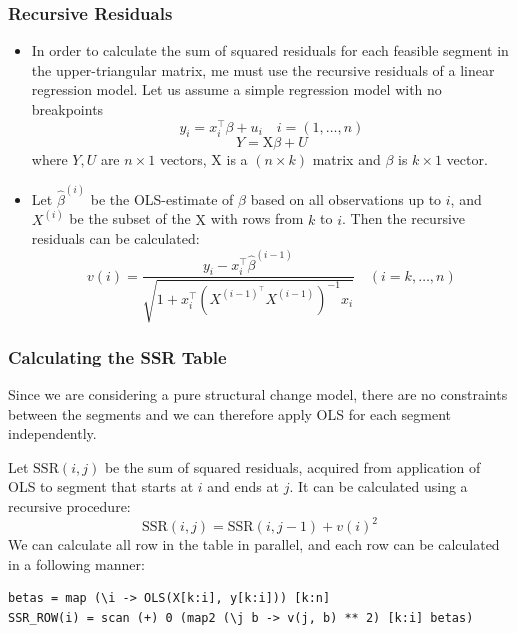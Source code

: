 \documentclass[presentation.tex]{subfiles}
\begin{document}
\begin{frame}
  \frametitle{Recursive Residuals}
  \begin{itemize}
  \item 
In order to calculate the sum of squared residuals for each feasible segment in
the upper-triangular matrix, me must use the recursive residuals of a linear
regression model. Let us assume a simple regression model with no breakpoints
\[
y_i = x_i^{\top} \beta + u_i \quad i = (1, \hdots, n)
\]
\[
Y = \mathrm{X}\beta + U
\]
where $Y, U$ are $n \times 1$ vectors, $\mathrm{X}$ is a $(n \times k)$ matrix
and $\beta$ is $k \times 1$ vector.

\item 
Let $\hat{\beta}^{(i)}$ be the OLS-estimate of $\beta$
based on all observations up to $i$, and $X^{(i)}$ be the subset of the
$\mathrm{X}$ with rows from $k$ to $i$.
Then the recursive residuals can be calculated:
\[
v(i)=\frac{y_{i}-x_{i}^{\top}
  \hat{\beta}^{(i-1)}}{\sqrt{1+x_{i}^{\top}\left(X^{(i-1)^{\top}}
    X^{(i-1)}\right)^{-1} x_{i}}} \quad(i=k, \ldots, n)
\]

  \end{itemize}
\end{frame}

\begin{frame}[fragile]
  \frametitle{Calculating the SSR Table}
Since we are considering a pure
structural change model, there are no constraints between the segments and we
can therefore apply OLS for each segment independently.

Let $\text{SSR}(i, j)$  be the sum of squared residuals, acquired from
application of OLS to segment that starts at $i$ and ends at $j$.
It can be calculated using a recursive procedure:
\[
\text{SSR}(i,j) = \text{SSR}(i, j - 1) + v(i)^2
\]
We can calculate all row in the table in parallel, and each row can be calculated
in a following manner:
\begin{verbatim}
betas = map (\i -> OLS(X[k:i], y[k:i])) [k:n]
SSR_ROW(i) = scan (+) 0 (map2 (\j b -> v(j, b) ** 2) [k:i] betas)
\end{verbatim}
\end{frame}
\end{document}
